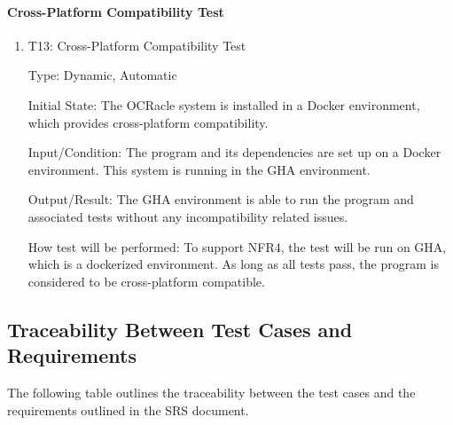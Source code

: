 \documentclass[12pt, titlepage]{article}
\begin{document}
\paragraph{Cross-Platform Compatibility Test}

\begin{enumerate}

\item{T13: Cross-Platform Compatibility Test\\}

Type: Dynamic, Automatic
					
Initial State: The OCRacle system is installed in a Docker environment, which
provides cross-platform compatibility. 
					
Input/Condition: The program and its dependencies are set up on a Docker
environment. This system is running in the GHA environment.
					
Output/Result: The GHA environment is able to run the program and associated
tests without any incompatibility related issues.
					
How test will be performed: To support NFR4, the test will be run on GHA, which
is a dockerized environment. As long as all tests pass, the program is
considered to be cross-platform compatible.

\end{enumerate}

\subsection{Traceability Between Test Cases and Requirements}

The following table outlines the traceability between the test cases and the
requirements outlined in the SRS document.
\end{document}

